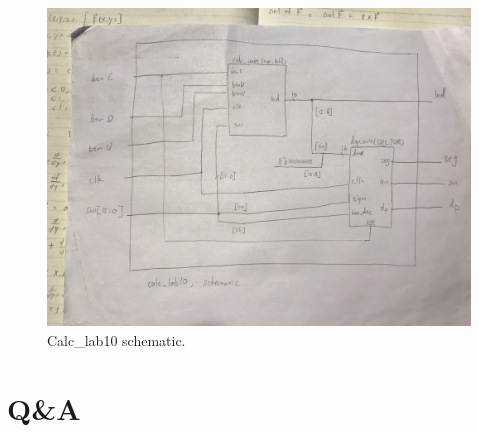 \documentclass[11pt]{article}
\begin{document}
\begin{figure}[ht]\centering
	\includegraphics[width=\textwidth]{calclab10}
	\caption{Calc\_lab10 schematic.}
	\label{fig:calc_lab10}			%
\end{figure}
\clearpage

\section*{Q\&A}
\end{document}

